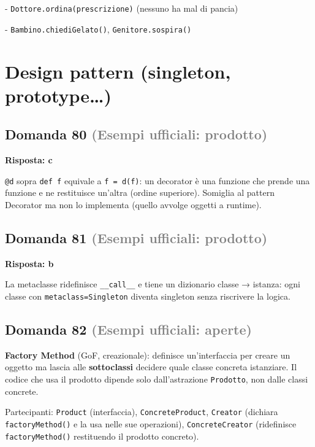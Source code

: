\documentclass[a4paper,11pt]{article}
\begin{document}
- \texttt{Dottore.ordina(prescrizione)} (nessuno ha mal di pancia)

- \texttt{Bambino.chiediGelato()}, \texttt{Genitore.sospira()}



\section{Design pattern (singleton, prototype…)}

\subsection*{Domanda 80 \hfill {\small \textcolor{gray}{(Esempi ufficiali: prodotto)}}}
\textbf{Risposta: c}\par
\texttt{@d} sopra \texttt{def f} equivale a \texttt{f = d(f)}: un decorator è una funzione che prende una funzione e ne restituisce un'altra (ordine superiore). Somiglia al pattern Decorator ma non lo implementa (quello avvolge oggetti a runtime).



\subsection*{Domanda 81 \hfill {\small \textcolor{gray}{(Esempi ufficiali: prodotto)}}}
\textbf{Risposta: b}\par
La metaclasse ridefinisce \texttt{\_\_call\_\_} e tiene un dizionario classe → istanza: ogni classe con \texttt{metaclass=Singleton} diventa singleton senza riscrivere la logica.



\subsection*{Domanda 82 \hfill {\small \textcolor{gray}{(Esempi ufficiali: aperte)}}}
\textbf{Factory Method} (GoF, creazionale): definisce un'interfaccia per creare un oggetto ma lascia alle \textbf{sottoclassi} decidere quale classe concreta istanziare. Il codice che usa il prodotto dipende solo dall'astrazione \texttt{Prodotto}, non dalle classi concrete.

Partecipanti: \texttt{Product} (interfaccia), \texttt{ConcreteProduct}, \texttt{Creator} (dichiara \texttt{factoryMethod()} e la usa nelle sue operazioni), \texttt{ConcreteCreator} (ridefinisce \texttt{factoryMethod()} restituendo il prodotto concreto).
\end{document}
